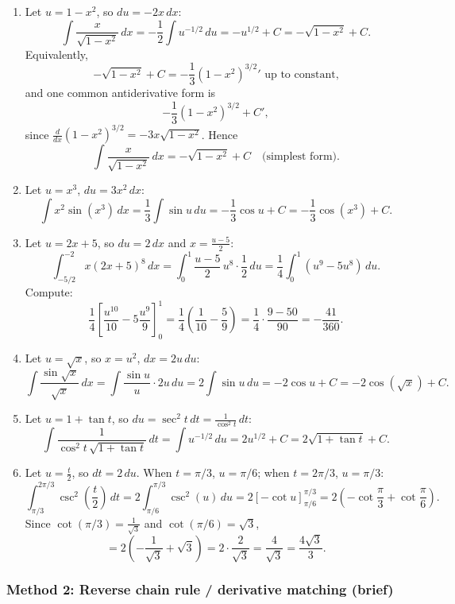 \documentclass[12pt]{article}
\begin{document}
\begin{enumerate}[label=(\roman*)]
\item Let \(u=1-x^2\), so \(du=-2x\,dx\):
\[
\int \frac{x}{\sqrt{1-x^2}}\,dx
= -\frac{1}{2}\int u^{-1/2}\,du
= -u^{1/2}+C
= -\sqrt{1-x^2}+C.
\]
Equivalently,
\[
-\sqrt{1-x^2}+C = -\frac{1}{3}(1-x^2)^{3/2}{}' \text{ up to constant,}
\]
and one common antiderivative form is
\[
-\frac{1}{3}(1-x^2)^{3/2}+C',
\]
since \(\frac{d}{dx}(1-x^2)^{3/2}=-3x\sqrt{1-x^2}\). Hence
\[
\int \frac{x}{\sqrt{1-x^2}}\,dx = -\sqrt{1-x^2}+C
\quad\text{(simplest form).}
\]

\item Let \(u=x^3\), \(du=3x^2\,dx\):
\[
\int x^2\sin(x^3)\,dx=\frac{1}{3}\int \sin u\,du = -\frac{1}{3}\cos u + C = -\frac{1}{3}\cos(x^3)+C.
\]

\item Let \(u=2x+5\), so \(du=2\,dx\) and \(x=\frac{u-5}{2}\):
\[
\int_{-5/2}^{-2} x(2x+5)^8\,dx
=\int_{0}^{1} \frac{u-5}{2}\,u^8 \cdot \frac{1}{2}\,du
=\frac{1}{4}\int_0^1 (u^9-5u^8)\,du.
\]
Compute:
\[
\frac{1}{4}\left[\frac{u^{10}}{10}-5\frac{u^9}{9}\right]_0^1
=\frac{1}{4}\left(\frac{1}{10}-\frac{5}{9}\right)
=\frac{1}{4}\cdot\frac{9-50}{90}
=-\frac{41}{360}.
\]

\item Let \(u=\sqrt{x}\), so \(x=u^2\), \(dx=2u\,du\):
\[
\int \frac{\sin\sqrt{x}}{\sqrt{x}}\,dx
=\int \frac{\sin u}{u}\cdot 2u\,du
=2\int \sin u\,du
=-2\cos u + C
=-2\cos(\sqrt{x})+C.
\]

\item Let \(u=1+\tan t\), so \(du=\sec^2 t\,dt=\frac{1}{\cos^2 t}\,dt\):
\[
\int \frac{1}{\cos^2 t\,\sqrt{1+\tan t}}\,dt
=\int u^{-1/2}\,du
=2u^{1/2}+C
=2\sqrt{1+\tan t}+C.
\]

\item Let \(u=\frac{t}{2}\), so \(dt=2\,du\). When \(t=\pi/3\), \(u=\pi/6\); when \(t=2\pi/3\), \(u=\pi/3\):
\[
\int_{\pi/3}^{2\pi/3}\csc^2\!\left(\frac{t}{2}\right)\,dt
=2\int_{\pi/6}^{\pi/3}\csc^2(u)\,du
=2\left[-\cot u\right]_{\pi/6}^{\pi/3}
=2\left(-\cot\frac{\pi}{3}+\cot\frac{\pi}{6}\right).
\]
Since \(\cot(\pi/3)=\frac{1}{\sqrt{3}}\) and \(\cot(\pi/6)=\sqrt{3}\),
\[
=2\left(-\frac{1}{\sqrt{3}}+\sqrt{3}\right)
=2\cdot\frac{2}{\sqrt{3}}
=\frac{4}{\sqrt{3}}
=\frac{4\sqrt{3}}{3}.
\]
\end{enumerate}

\subsubsection*{Method 2: Reverse chain rule / derivative matching (brief)}
\end{document}
